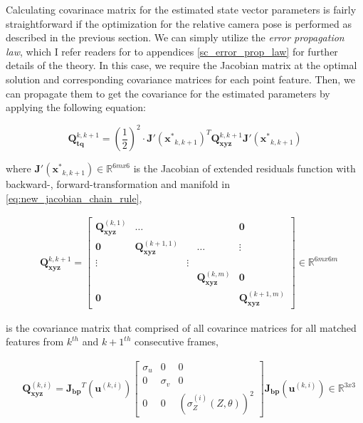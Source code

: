 \documentclass[a4paper]{report}
\numberwithin{figure}{section}
\newcommand{\R}{\mathbb{R}}
\begin{document}
Calculating covarinace matrix for the estimated state vector parameters is
fairly straightforward if the optimization for the relative camera pose is
performed as described in the previous section. We can simply utilize the
\textit{error propagation law}, which I refer readers for to appendices
\ref{sc_error_prop_law} for further details of the theory.  In this case, we
require the Jacobian matrix at the optimal solution and corresponding
covariance  matrices for each point feature. Then, we can propagate them to get
the covariance for the estimated parameters by applying the following equation:

\begin{equation}\label{eq:cov_tq_prop} \mathbf{Q}_{\mathbf{tq}}^{k,k+1} =
(\frac{1}{2})^2 \cdot \mathbf{J'}(\mathbf{x^*}_{k,k+1})^T
\mathbf{Q}_{\mathbf{xyz}}^{k,k+1} \mathbf{J'}(\mathbf{x^*}_{k,k+1})
\end{equation}

where $\mathbf{J'}(\mathbf{x^*}_{k,k+1}) \in \R^{6mx6}$ is the Jacobian of
extended residuals function with backward-, forward-transformation and manifold
in \eqref{eq:new_jacobian_chain_rule},

\begin{equation} \begin{aligned} & \mathbf{Q}_{\mathbf{xyz}}^{k,k+1}  =
\begin{bmatrix} \mathbf{Q}_{\mathbf{xyz}}^{(k,1)} & \dots & & &\mathbf{0} \\
\mathbf{0} & \mathbf{Q}_{\mathbf{xyz}}^{(k+1,1)} & &\dots & \vdots  \\ \vdots &
& \vdots &  &\\ &  & & \mathbf{Q}_{\mathbf{xyz}}^{(k,m)} & \mathbf{0} \\
\mathbf{0} &  & & & \mathbf{Q}_{\mathbf{xyz}}^{(k+1,m)} \end{bmatrix} \in
\R^{6mx6m} \end{aligned} \end{equation}

is the covariance matrix that comprised of all covarince matrices for all
matched features from $k^{th}$ and $k+1^{th}$ consecutive frames,

\begin{equation}\label{eq:cov_xyz_prop} \begin{aligned} &
\mathbf{Q}_{\mathbf{xyz}}^{(k,i)} = \mathbf{J_{bp}}^T(\mathbf{u}^{(k,i)})
\begin{bmatrix} \sigma_u & 0 & 0 \\ 0 & \sigma_v & 0 \\ 0 & 0 &
(\sigma_Z^{(i)}(Z, \theta))^2 \end{bmatrix} \mathbf{J_{bp}}(\mathbf{u}^{(k,i)})
\in \R^{3x3} \end{aligned} \end{equation}
\end{document}
